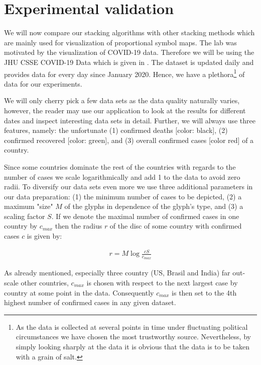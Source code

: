 \documentclass[a4paper,11pt]{article}
\begin{document}
\section{Experimental validation}

We will now compare our stacking algorithms with other stacking methods which are mainly used for visualization of proportional symbol maps. The lab was motivated by the visualization of COVID-19 data. Therefore we will be using the JHU CSSE COVID-19 Data which is given in \cite{data}. The dataset is updated daily and provides data for every day since January 2020. Hence, we have a plethora\footnote{As the data is collected at several points in time under fluctuating political circumstances we have chosen the most trustworthy source. Nevertheless, by simply looking sharply at the data it is obvious that the data is to be taken with a grain of salt.} of data for our experiments.

We will only cherry pick a few data sets as the data quality naturally varies, however, the reader may use our application to look at the results for different dates and inspect interesting data sets in detail. Further, we will always use three features, namely:  the unfortunate (1) confirmed deaths [color: black], (2) confirmed recovered [color: green], and (3) overall confirmed cases [color red] of a country.

Since some countries dominate the rest of the countries with regards to the number of cases we scale logarithmically and add 1 to the data to avoid zero radii. To diversify our data sets even more we use three additional parameters in our data preparation: (1) the minimum number of cases to be depicted, (2) a maximum "size" $M$ of the glyphs in dependence of the glyph's type, and (3) a scaling factor $S$. If we denote the maximal number of confirmed cases in one country by $c_{max}$ then the radius $r$ of the disc of some country with confirmed cases $c$ is given by:

\begin{align*}
  r=M\log\frac{c S}{c_{max}}
\end{align*}

As already mentioned, especially three country (US, Brasil and India) far out-scale other countries, $c_{max}$ is chosen with respect to the next largest case by country at some point in the data. Consequently $c_{max}$ is then set to the 4th highest number of confirmed cases in any given dataset.
\end{document}
